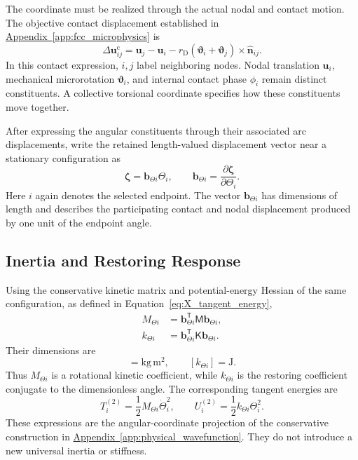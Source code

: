 The coordinate must be realized through the actual nodal and contact motion. The objective contact displacement established in \hyperref[app:fcc_microphysics]{Appendix~\ref*{app:fcc_microphysics}} is
\begin{equation}
    \Delta\mathbf u^{\mathrm c}_{ij}
    =\mathbf u_j-\mathbf u_i
    -r_{\mathrm D}(\boldsymbol\vartheta_i+\boldsymbol\vartheta_j)
    \times\widehat{\mathbf n}_{ij}.
\end{equation}
In this contact expression, $i,j$ label neighboring nodes. Nodal translation $\mathbf u_i$, mechanical microrotation $\boldsymbol\vartheta_i$, and internal contact phase $\phi_i$ remain distinct constituents. A collective torsional coordinate specifies how these constituents move together.

After expressing the angular constituents through their associated arc displacements, write the retained length-valued displacement vector near a stationary configuration as
\begin{equation}
    \boldsymbol\zeta=\mathbf b_{\Theta i}\Theta_i,
    \qquad
    \mathbf b_{\Theta i}
    =\frac{\partial\boldsymbol\zeta}{\partial\Theta_i}.
\end{equation}
Here $i$ again denotes the selected endpoint. The vector $\mathbf b_{\Theta i}$ has dimensions of length and describes the participating contact and nodal displacement produced by one unit of the endpoint angle.

\subsection{Inertia and Restoring Response}

Using the conservative kinetic matrix and potential-energy Hessian of the same configuration, as defined in Equation~\eqref{eq:X_tangent_energy},
\begin{equation}
    \boxed{
    \begin{aligned}
    M_{\Theta i}
    &=\mathbf b_{\Theta i}^{\mathsf T}
      \mathsf M\mathbf b_{\Theta i},\\
    k_{\Theta i}
    &=\mathbf b_{\Theta i}^{\mathsf T}
      \mathsf K\mathbf b_{\Theta i}.
    \end{aligned}
    }
\end{equation}
Their dimensions are
\begin{equation}
    [M_{\Theta i}]=\mathrm{kg\,m^2},
    \qquad
    [k_{\Theta i}]=\mathrm J.
\end{equation}
Thus $M_{\Theta i}$ is a rotational kinetic coefficient, while $k_{\Theta i}$ is the restoring coefficient conjugate to the dimensionless angle. The corresponding tangent energies are
\begin{equation}
    T_i^{(2)}=\frac12M_{\Theta i}\dot\Theta_i^2,
    \qquad
    U_i^{(2)}=\frac12k_{\Theta i}\Theta_i^2.
\end{equation}
These expressions are the angular-coordinate projection of the conservative construction in \hyperref[app:physical_wavefunction]{Appendix~\ref*{app:physical_wavefunction}}. They do not introduce a new universal inertia or stiffness.

